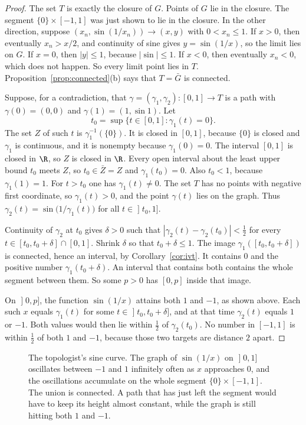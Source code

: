 \begin{proof}
The set $T$ is exactly the closure of $G$. Points of $G$ lie in the closure. The segment $\{0\}\times[-1,1]$ was just shown to lie in the closure. In the other direction, suppose $(x_n,\sin(1/x_n))\to(x,y)$ with $0<x_n\le1$. If $x>0$, then eventually $x_n>x/2$, and continuity of sine gives $y=\sin(1/x)$, so the limit lies on $G$. If $x=0$, then $|y|\le1$, because $|\sin|\le1$. If $x<0$, then eventually $x_n<0$, which does not happen. So every limit point lies in $T$. Proposition~\ref{prop:connected}(b) says that $T=\bar G$ is connected.

Suppose, for a contradiction, that $\gamma=(\gamma_1,\gamma_2):[0,1]\to T$ is a path with $\gamma(0)=(0,0)$ and $\gamma(1)=(1,\sin1)$. Let
\[
t_0=\sup\{t\in[0,1]:\gamma_1(t)=0\}.
\]
The set $Z$ of such $t$ is $\gamma_1^{-1}(\{0\})$. It is closed in $[0,1]$, because $\{0\}$ is closed and $\gamma_1$ is continuous, and it is nonempty because $\gamma_1(0)=0$. The interval $[0,1]$ is closed in $\R$, so $Z$ is closed in $\R$. Every open interval about the least upper bound $t_0$ meets $Z$, so $t_0\in\bar Z=Z$ and $\gamma_1(t_0)=0$. Also $t_0<1$, because $\gamma_1(1)=1$. For $t>t_0$ one has $\gamma_1(t)\ne0$. The set $T$ has no points with negative first coordinate, so $\gamma_1(t)>0$, and the point $\gamma(t)$ lies on the graph. Thus $\gamma_2(t)=\sin\bigl(1/\gamma_1(t)\bigr)$ for all $t\in\mathopen]t_0,1]$.

Continuity of $\gamma_2$ at $t_0$ gives $\delta>0$ such that $|\gamma_2(t)-\gamma_2(t_0)|<\frac12$ for every $t\in[t_0,t_0+\delta]\cap[0,1]$. Shrink $\delta$ so that $t_0+\delta\le1$. The image $\gamma_1([t_0,t_0+\delta])$ is connected, hence an interval, by Corollary~\ref{cor:ivt}. It contains $0$ and the positive number $\gamma_1(t_0+\delta)$. An interval that contains both contains the whole segment between them. So some $p>0$ has $[0,p]$ inside that image.

On $\mathopen]0,p]$, the function $\sin(1/x)$ attains both $1$ and $-1$, as shown above. Each such $x$ equals $\gamma_1(t)$ for some $t\in\mathopen]t_0,t_0+\delta]$, and at that time $\gamma_2(t)$ equals $1$ or $-1$. Both values would then lie within $\frac12$ of $\gamma_2(t_0)$. No number in $[-1,1]$ is within $\frac12$ of both $1$ and $-1$, because those two targets are distance $2$ apart.
\end{proof}

\begin{figure}[ht]
\centering
{}
\caption{The topologist's sine curve. The graph of $\sin(1/x)$ on $\mathopen]0,1]$ oscillates between $-1$ and $1$ infinitely often as $x$ approaches $0$, and the oscillations accumulate on the whole segment $\{0\}\times[-1,1]$. The union is connected. A path that has just left the segment would have to keep its height almost constant, while the graph is still hitting both $1$ and $-1$.}
\label{fig:sine}
\end{figure}

